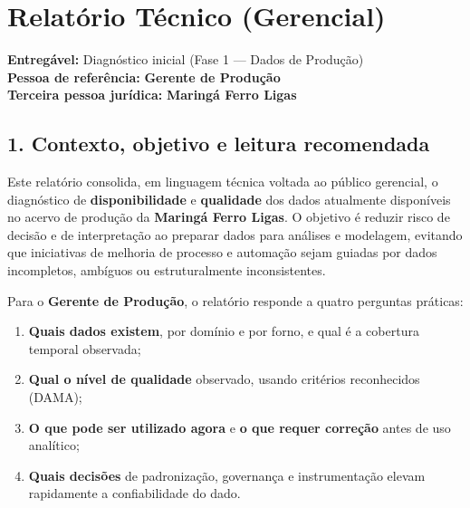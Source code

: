 \newpage

\section{\texorpdfstring{\textbf{Relatório Técnico
(Gerencial)}}{Relatório Técnico (Gerencial)}}\label{relatuxf3rio-tuxe9cnico-gerencial}

\textbf{Entregável:} Diagnóstico inicial (Fase 1 --- Dados de
Produção)\\
\textbf{Pessoa de referência:} \textbf{Gerente de Produção}\\
\textbf{Terceira pessoa jurídica:} \textbf{Maringá Ferro Ligas}

\newpage

\subsection{\texorpdfstring{\textbf{1. Contexto, objetivo e leitura
recomendada}}{1. Contexto, objetivo e leitura recomendada}}\label{contexto-objetivo-e-leitura-recomendada}

Este relatório consolida, em linguagem técnica voltada ao público
gerencial, o diagnóstico de \textbf{disponibilidade} e
\textbf{qualidade} dos dados atualmente disponíveis no acervo de
produção da \textbf{Maringá Ferro Ligas}. O objetivo é reduzir risco de
decisão e de interpretação ao preparar dados para análises e modelagem,
evitando que iniciativas de melhoria de processo e automação sejam
guiadas por dados incompletos, ambíguos ou estruturalmente
inconsistentes.

Para o \textbf{Gerente de Produção}, o relatório responde a quatro
perguntas práticas:

\begin{enumerate}
\def\labelenumi{\arabic{enumi})}
\tightlist
\item
  \textbf{Quais dados existem}, por domínio e por forno, e qual é a
  cobertura temporal observada;\\
\item
  \textbf{Qual o nível de qualidade} observado, usando critérios
  reconhecidos (DAMA);\\
\item
  \textbf{O que pode ser utilizado agora} e \textbf{o que requer
  correção} antes de uso analítico;\\
\item
  \textbf{Quais decisões} de padronização, governança e instrumentação
  elevam rapidamente a confiabilidade do dado.
\end{enumerate}

